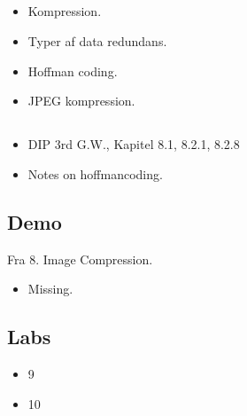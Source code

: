 \subsection{\subtopics}

\begin{itemize}
	\item Kompression.
	\item Typer af data redundans.
	\item Hoffman coding.
	\item JPEG kompression.
\end{itemize}

\subsection{\curriculum}

\begin{itemize}
	\item DIP 3rd G.W., Kapitel 8.1, 8.2.1, 8.2.8
	\item Notes on hoffmancoding.
\end{itemize}

\subsection{Demo}

Fra 8. Image Compression.

\begin{itemize}
	\item Missing.
\end{itemize}

\subsection{Labs}

\begin{itemize}
	\item 9
	\item 10
\end{itemize}
